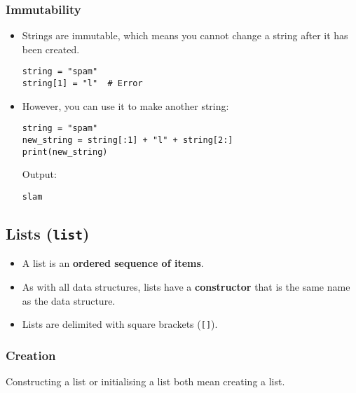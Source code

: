 \documentclass[11pt]{article}
\begin{document}
\subsubsection{Immutability}
\label{sec:org07c26ab}
\begin{itemize}
\item Strings are immutable, which means you cannot change a string after it has been created.
\begin{verbatim}
string = "spam"
string[1] = "l"  # Error
\end{verbatim}

\item However, you can use it to make another string:
\begin{verbatim}
string = "spam"
new_string = string[:1] + "l" + string[2:]
print(new_string)
\end{verbatim}

 \noindent Output:

\label{org56591e0}
\begin{verbatim}
slam
\end{verbatim}
\end{itemize}

 \newpage
\subsection{Lists (\texttt{list})}
\label{sec:org6e0dcdc}
\begin{itemize}
\item A list is an \textbf{ordered sequence of items}.
\item As with all data structures, lists have a \textbf{constructor} that is the same name as the data structure.
\item Lists are delimited with square brackets (\texttt{[]}).
\end{itemize}
\subsubsection{Creation}
\label{sec:orgc318c62}
Constructing a list or initialising a list both mean creating a list.
\end{document}
